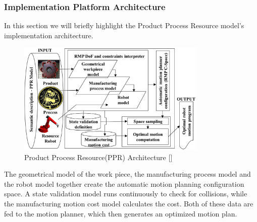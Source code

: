 \subsubsection{Implementation Platform Architecture}
In this section we will briefly highlight the Product Process Resource model's implementation architecture.
\begin{figure}[htbp] %
 \centering
   \includegraphics[width=9cm]{images/ppr_2.png}
   \caption[Product Process Resource(PPR) Architecture]
   { Product Process Resource(PPR) Architecture [\citet{DiazP2016}]}  
\label{fig:img8}
\end{figure}

The geometrical model of the work piece, the manufacturing process model and the robot model together create the automatic motion planning configuration space. A state validation model runs continuously to check for collisions, while the manufacturing motion cost model calculates the cost. Both of these data are fed to the motion planner, which then generates an optimized motion plan. 
\pagebreak